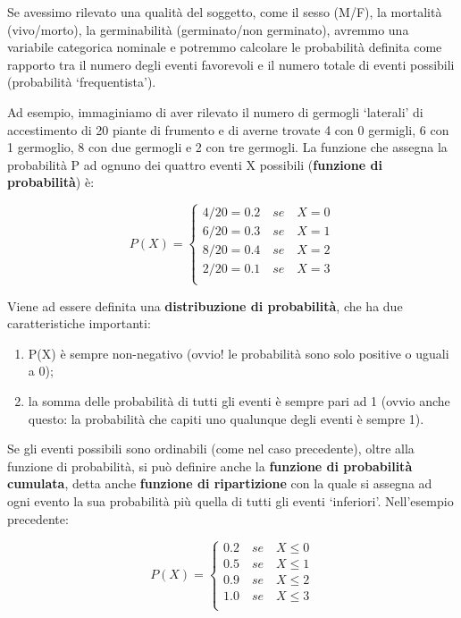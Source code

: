 \documentclass[a4paper,12pt,oneside]{book}
\providecommand{\tightlist}{%
  \setlength{\itemsep}{0pt}\setlength{\parskip}{0pt}}
\begin{document}
Se avessimo rilevato una qualità del soggetto, come il sesso (M/F), la mortalità (vivo/morto), la germinabilità (germinato/non germinato), avremmo una variabile categorica nominale e potremmo calcolare le probabilità definita come rapporto tra il numero degli eventi favorevoli e il numero totale di eventi possibili (probabilità `frequentista').

Ad esempio, immaginiamo di aver rilevato il numero di germogli `laterali' di accestimento di 20 piante di frumento e di averne trovate 4 con 0 germigli, 6 con 1 germoglio, 8 con due germogli e 2 con tre germogli. La funzione che assegna la probabilità P ad ognuno dei quattro eventi X possibili (\textbf{funzione di probabilità}) è:

\[
P(X) = \left\{ \begin{array}{l}
 4/20 = 0.2 \,\,\,\,\,\,se\,\,\,\,\,\,X = 0 \\ 
 6/20 = 0.3 \,\,\,\,\,\,se\,\,\,\,\,\,X = 1 \\ 
 8/20 = 0.4\,\,\,\,\,\,se\,\,\,\,\,\, X = 2 \\ 
 2/20 = 0.1 \,\,\,\,\,\,se\,\,\,\,\,\,X = 3 \\ 
 \end{array} \right.
\]

Viene ad essere definita una \textbf{distribuzione di probabilità}, che ha due caratteristiche importanti:

\begin{enumerate}
\def\labelenumi{\arabic{enumi}.}
\tightlist
\item
  P(X) è sempre non-negativo (ovvio! le probabilità sono solo positive o uguali a 0);
\item
  la somma delle probabilità di tutti gli eventi è sempre pari ad 1 (ovvio anche questo: la probabilità che capiti uno qualunque degli eventi è sempre 1).
\end{enumerate}

Se gli eventi possibili sono ordinabili (come nel caso precedente), oltre alla funzione di probabilità, si può definire anche la \textbf{funzione di probabilità cumulata}, detta anche \textbf{funzione di ripartizione} con la quale si assegna ad ogni evento la sua probabilità più quella di tutti gli eventi `inferiori'. Nell'esempio precedente:

\[
P(X) = \left\{ \begin{array}{l}
 0.2\,\,\,\,\,\,se\,\,\,\,\,\,X \leq 0 \\ 
 0.5\,\,\,\,\,\,se\,\,\,\,\,\,X \leq 1 \\ 
 0.9\,\,\,\,\,\,se\,\,\,\,\,\,X \leq 2 \\ 
 1.0\,\,\,\,\,\,se\,\,\,\,\,\,X \leq 3 \\ 
 \end{array} \right.
\]
\end{document}
